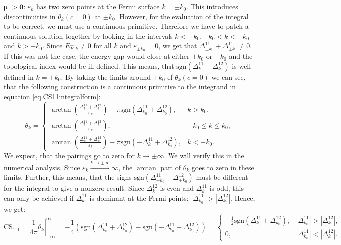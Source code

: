 $\boldsymbol\mu \; \mathbf{> 0}$: $\varepsilon_k$ has two zero points at the Fermi surface $k = \pm k_0$. This introduces discontinuities in $\theta_k(c = 0)$ at $\pm k_0$. However, for the evaluation of the integral to be correct, we must use a continuous primitive. Therefore we have to patch a continuous solution together by looking in the intervals $k < -k_0, -k_0 < k < +k_0$ and $k > +k_0$. Since $E^{\pm}_{F,k} \neq 0$ for all $k$ and $\varepsilon_{\pm k_0} = 0$, we get that $\Delta^{11}_{\pm k_0} + \Delta^{11}_{\pm k_0} \neq 0$. If this was not the case, the energy gap would close at either $+k_0$ or $-k_0$ and the topological index would be ill-defined. This means, that $\text{sgn}(\Delta^{11}_k + \Delta^{12}_k)$ is well-defined in $k = \pm k_0$. By taking the limits around $\pm k_0$ of $\theta_k(c = 0)$ we can see, that the following construction is a continuous primitive to the integrand in equation \eqref{eq.CS11integralform}:
\begin{equation}
\theta_k = \left\{ \begin{matrix} 
\arctan\left(\frac{\Delta^{11}_k + \Delta^{12}_k }{\varepsilon_k}\right) - \pi\text{sgn}(\Delta^{11}_{k_0} + \Delta^{12}_{k_0}), & k > k_0, \\
\arctan\left(\frac{\Delta^{11}_k + \Delta^{12}_k }{\varepsilon_k}\right), & -k_0 \leq k \leq k_0, \\
\arctan\left(\frac{\Delta^{11}_k + \Delta^{12}_k }{\varepsilon_k}\right) - \pi \text{sgn}(-\Delta^{11}_{k_0} + \Delta^{12}_{k_0}), & k < -k_0.
  \end{matrix} \right.
\label{eq.2wires.Gkmugreater0}
\end{equation}
We expect, that the pairings go to zero for $k\to \pm \infty$. We will verify this in the numerical analysis. Since $\varepsilon_k \overset{k\to \pm \infty}{\to} \infty$, the $\arctan$ part of $\theta_k$ goes to zero in these limits. Further, this means, that the signs $\text{sgn}(\Delta^{11}_{\pm k_0} + \Delta^{12}_{\pm k_0})$ must be different for the integral to give a nonzero result. Since $\Delta^{12}_{k}$ is even and $\Delta^{11}_{k}$ is odd, this can only be achieved if $\Delta^{11}_{k}$ is dominant at the Fermi points: $|\Delta^{11}_{k_0}| > |\Delta^{12}_{k_0}|$. Hence, we get:
\begin{equation}
\text{CS}_{1,1} = \left. \frac{1}{4\pi} \theta_k \right|^\infty_{-\infty} = -\frac{1}{4}(\text{sgn}(\Delta^{11}_{k_0} + \Delta^{12}_{k_0}) - \text{sgn}(-\Delta^{11}_{k_0} + \Delta^{12}_{k_0})) = \left\{ \begin{matrix} 
-\frac{1}{2}\text{sgn}(\Delta^{11}_{k_0} + \Delta^{12}_{k_0}) , & |\Delta^{11}_{k_0}| > |\Delta^{12}_{k_0}|, \\
0, & |\Delta^{11}_{k_0}| < |\Delta^{12}_{k_0}|.
  \end{matrix} \right. \nonumber 
\end{equation}

